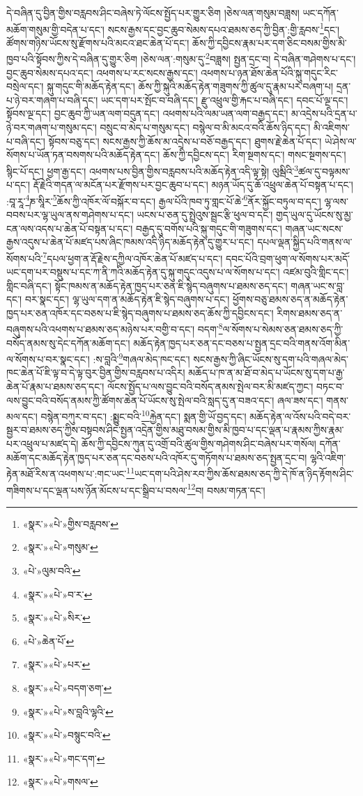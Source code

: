 དེ་བཞིན་དུ་བྱིན་གྱིས་བརླབས་ཤིང་བཞེས་ཏེ་ལོངས་སྤྱོད་པར་གྱུར་ཅིག །ཅེས་ལན་གསུམ་བཟླས། ཡང་དཀོན་མཆོག་གསུམ་གྱི་བདེན་པ་དང་། སངས་རྒྱས་དང་བྱང་ཆུབ་སེམས་དཔའ་ཐམས་ཅད་ཀྱི་བྱིན་:གྱི་རླབས་\footnote{«སྣར་»«པེ་»གྱིས་བརླབས་}དང་། ཚོགས་གཉིས་ཡོངས་སུ་རྫོགས་པའི་མངའ་ཐང་ཆེན་པོ་དང་། ཆོས་ཀྱི་དབྱིངས་རྣམ་པར་དག་ཅིང་བསམ་གྱིས་མི་ཁྱབ་པའི་སྟོབས་ཀྱིས་དེ་བཞིན་དུ་གྱུར་ཅིག །ཅེས་ལན་:གསུམ་དུ་\footnote{«སྣར་»«པེ་»གསུམ་}བཟླས། སྤྱན་དྲང་བ། དེ་བཞིན་གཤེགས་པ་དང་། བྱང་ཆུབ་སེམས་དཔའ་དང་། འཕགས་པ་རང་སངས་རྒྱས་དང་། འཕགས་པ་ཉན་ཐོས་ཆེན་པོའི་སྐུ་གདུང་རིང་བསྲེལ་དང་། སྐུ་གདུང་གི་མཆོད་རྟེན་དང་། ཆོས་ཀྱི་སྐུའི་མཆོད་རྟེན་གཟུགས་ཀྱི་ཚུལ་དུ་རྣམ་པར་བཞག་པ། དྲན་པ་ཉེ་བར་གཞག་པ་བཞི་དང་། ཡང་དག་པར་སྤོང་བ་བཞི་དང་། རྫུ་འཕྲུལ་གྱི་རྐང་པ་བཞི་དང་། དབང་པོ་ལྔ་དང་། སྟོབས་ལྔ་དང་། བྱང་ཆུབ་ཀྱི་ཡན་ལག་བདུན་དང་། འཕགས་པའི་ལམ་ཡན་ལག་བརྒྱད་དང་། མ་འདྲེས་པའི་དྲན་པ་ཉེ་བར་གཞག་པ་གསུམ་དང་། བསྲུང་བ་མེད་པ་གསུམ་དང་། བསྙེལ་བ་མི་མངའ་བའི་ཆོས་ཉིད་དང་། མི་འཇིགས་པ་བཞི་དང་། སྟོབས་བཅུ་དང་། སངས་རྒྱས་ཀྱི་ཆོས་མ་འདྲེས་པ་བཅོ་བརྒྱད་དང་། ཐུགས་རྗེ་ཆེན་པོ་དང་། ཡེ་ཤེས་ལ་སོགས་པ་ཡོན་ཏན་བསགས་པའི་མཆོད་རྟེན་དང་། ཆོས་ཀྱི་དབྱིངས་དང་། རིག་སྔགས་དང་། གསང་སྔགས་དང་། སྙིང་པོ་དང་། ཕྱག་རྒྱ་དང་། འཕགས་པས་བྱིན་གྱིས་བརླབས་པའི་མཆོད་རྟེན་འདི་ལྟ་སྟེ། ལུམྦིའི་\footnote{«པེ་»ལུམ་བའི་}ཚལ་དུ་བལྟམས་པ་དང་། རྡོ་རྗེའི་གདན་ལ་མངོན་པར་རྫོགས་པར་བྱང་ཆུབ་པ་དང་། མཉན་ཡོད་དུ་ཆོ་འཕྲུལ་ཆེན་པོ་བསྟན་པ་དང་། :བཱ་རཱ་\footnote{«སྣར་»«པེ་»བ་ར་}ཎ་སཱིར་\footnote{«སྣར་»«པེ་»སིར་}ཆོས་ཀྱི་འཁོར་ལོ་བསྐོར་བ་དང་། རྒྱལ་པོའི་ཁབ་ཏུ་གླང་པོ་ཆེ་\footnote{«པེ་»ཆེན་པོ་}ནོར་སྐྱོང་བཏུལ་བ་དང་། ལྷ་ལས་བབས་པར་ལྷ་ཡུལ་ནས་གཤེགས་པ་དང་། ཡངས་པ་ཅན་དུ་སྤྲེའུས་སྦྲང་རྩི་ཕུལ་བ་དང་། གྱད་ཡུལ་དུ་ཡོངས་སུ་མྱ་ངན་ལས་འདས་པ་ཆེན་པོ་བསྟན་པ་དང་། བརྒྱད་དུ་བགོས་པའི་སྐུ་གདུང་གི་གཟུགས་དང་། གཞན་ཡང་སངས་རྒྱས་འདུས་པ་ཆེན་པོ་མཛད་པས་ཞིང་ཁམས་འདི་ཉིད་མཆོད་རྟེན་དུ་གྱུར་པ་དང་། དཔལ་ལྡན་སྐྱིད་པའི་གནས་ལ་སོགས་པའི་\footnote{«སྣར་»«པེ་»པར་}དཔལ་ཕྱག་ན་རྡོ་རྗེས་དཀྱིལ་འཁོར་ཆེན་པོ་མཛད་པ་དང་། དབང་པོའི་བྲག་ཕུག་ལ་སོགས་པར་མདོ་ཡང་དག་པར་བསྡུས་པ་དང་ཀ་ནི་ཀའི་མཆོད་རྟེན་དུ་སྐུ་གདུང་འདུས་པ་ལ་སོགས་པ་དང་། འཛམ་བུའི་གླིང་དང་། གླིང་བཞི་དང་། སྟོང་ཁམས་ན་མཆོད་རྟེན་ཁྱད་པར་ཅན་ཇི་སྙེད་བཞུགས་པ་ཐམས་ཅད་དང་། གཞན་ཡང་ས་བླ་དང་། བར་སྣང་དང་། ལྷ་ཡུལ་དག་ན་མཆོད་རྟེན་ཇི་སྙེད་བཞུགས་པ་དང་། ཕྱོགས་བཅུ་ཐམས་ཅད་ན་མཆོད་རྟེན་ཁྱད་པར་ཅན་འཁོར་དང་བཅས་པ་ཇི་སྙེད་བཞུགས་པ་ཐམས་ཅད་ཆོས་ཀྱི་དབྱིངས་དང་། རིགས་ཐམས་ཅད་ན་བཞུགས་པའི་འཕགས་པ་ཐམས་ཅད་མཉེས་པར་བགྱི་བ་དང་། བདག་\footnote{«སྣར་»«པེ་»བདག་ཅག་}ལ་སོགས་པ་སེམས་ཅན་ཐམས་ཅད་ཀྱི་བསོད་ནམས་སུ་དེང་དཀོན་མཆོག་དང་། མཆོད་རྟེན་ཁྱད་པར་ཅན་དང་བཅས་པ་སྤྱན་དྲང་བའི་གནས་འོག་མིན་ལ་སོགས་པ་བར་སྣང་དང་། :ས་བླའི་\footnote{«སྣར་»«པེ་»ས་བླའི་ལྷའི་}གཞལ་མེད་ཁང་དང་། སངས་རྒྱས་ཀྱི་ཞིང་ཡོངས་སུ་དག་པའི་གཞལ་མེད་ཁང་ཆེན་པོ་ཇི་ལྟ་བ་དེ་ལྟ་བུར་བྱིན་གྱིས་བརླབས་པ་འདིར། མཆོད་པ་ཁ་ན་མ་ཐོ་བ་མེད་པ་ཡོངས་སུ་དག་པ་རྒྱ་ཆེན་པོ་རྣམ་པ་ཐམས་ཅད་དང་། ལོངས་སྤྱོད་པ་ལས་བྱུང་བའི་བསོད་ནམས་སྤེལ་བར་མི་མཛད་ཀྱང་། བཏང་བ་ལས་བྱུང་བའི་བསོད་ནམས་ཀྱི་ཚོགས་ཆེན་པོ་ཡོངས་སུ་སྤེལ་བའི་སླད་དུ་ན་བཟའ་དང་། ཞལ་ཟས་དང་། གནས་མལ་དང་། བསྙེན་བཀུར་བ་དང་། :སྨྱུང་བའི་\footnote{«སྣར་»«པེ་»བསྙུང་བའི་}རྐྱེན་དང་། སྨན་གྱི་ཡོ་བྱད་དང་། མཆོད་རྟེན་ལ་འོས་པའི་བདེ་བར་སྦྱར་བ་ཐམས་ཅད་ཀྱིས་བསྟབས་ཤིང་སྤྱན་འདྲེན་གྱིས་མཐུ་བསམ་གྱིས་མི་ཁྱབ་པ་དང་ལྡན་པ་རྣམས་ཀྱིས་རྣམ་པར་འཕྲུལ་པ་མཛད་དེ། ཆོས་ཀྱི་དབྱིངས་ཀུན་དུ་འགྲོ་བའི་ཚུལ་གྱིས་གཤེགས་ཤིང་བཞེས་པར་གསོལ། དཀོན་མཆོག་དང་མཆོད་རྟེན་ཁྱད་པར་ཅན་དང་བཅས་པའི་འཁོར་དུ་གཏོགས་པ་ཐམས་ཅད་སྤྱན་དྲང་བ། ལྷའི་འཇིག་རྟེན་མཐོ་རིས་ན་འཕགས་པ་:གང་ཡང་\footnote{«སྣར་»«པེ་»གང་དག་}ཡང་དག་པའི་ཤེས་རབ་ཀྱིས་ཆོས་ཐམས་ཅད་ཀྱི་དེ་ཁོ་ན་ཉིད་རྟོགས་ཤིང་གཟིགས་པ་དང་ལྡན་པས་ཉོན་མོངས་པ་དང་སྒྲིབ་པ་བསལ་\footnote{«སྣར་»«པེ་»གསལ་}བ། བསམ་གཏན་དང་། 